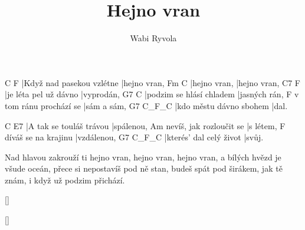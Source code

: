 \documentclass{song}
\title{Hejno vran}
\author{Wabi Ryvola}
\begin{document}
\strophe
C                         F
|Když nad pasekou vzlétne |hejno vran,
Fm           C
|hejno vran, |hejno vran,
C7                    F
|je léta pel už dávno |vyprodán,
G7                       C
|podzim se hlásí chladem |jasných rán,
                       F
v tom ránu prochází se |sám a sám,
G7                      C_F_C
|kdo městu dávno sbohem |dal.
\endstrophe

C                       E7
|A tak se touláš trávou |spálenou,
                        Am
nevíš, jak rozloučit se |s létem,
                    F
díváš se na krajinu |vzdálenou,
G7                      C_F_C
|kterés' dal celý život |svůj.
\endstrophe

\strophe*
Nad hlavou zakrouží ti hejno vran,
hejno vran, hejno vran,
a bílých hvězd je všude oceán,
přece si nepostavíš pod ně stan,
budeš spát pod širákem, jak tě znám,
i když už podzim přichází.
\endstrophe

\ref{}

\ref{}
\end{document}
